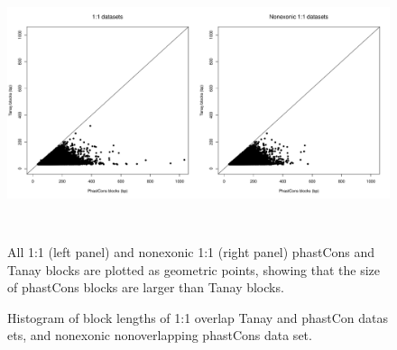 \documentclass[12pt]{report}
\begin{document}
\begin{figure}[htbp]
\centering
\includegraphics[width=\textwidth, height=80mm]{scatterplot_1_1_all_non}
\caption[Caption for LOF]{All 1:1 (left panel) and nonexonic 1:1 (right panel) phastCons and Tanay blocks are plotted as geometric points, showing that the size of phastCons blocks are larger than Tanay blocks.}
\label{fig:1_1_scatterplot}
\end{figure}

\begin{figure}[htbp]
\centering
{}
\caption[Caption for LOF]{\centering Histogram of block lengths of 1:1 overlap Tanay and phastCon datas ets, and nonexonic nonoverlapping phastCons data set.}
\label{fig:1_1_hists}
\end{figure}
\end{document}
